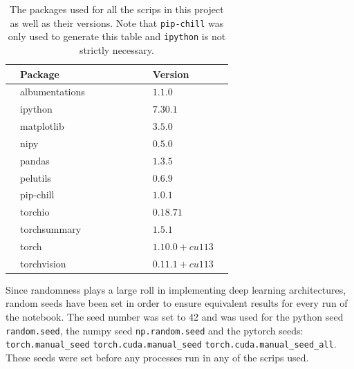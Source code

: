 \documentclass[12pt, fleqn, titlepage]{article}
\begin{document}
\begin{table}[H]
	\begin{center}
		\begin{tabular}{l l l l l l l l l l}
			\toprule			
			
			& \textbf{Package \cite{python_packages}}      & & & & & & & \textbf{Version}  & \\ \midrule
			& albumentations \cite{albumentations}         & & & & & & & $1.1.0$           & \\ 
			& ipython \cite{ipython}                       & & & & & & & $7.30.1$          & \\ 
			& matplotlib \cite{matplotlib}                 & & & & & & & $3.5.0$           & \\ 
			& nipy \cite{nipy}                             & & & & & & & $0.5.0$           & \\
			& pandas \cite{pandas}                         & & & & & & & $1.3.5$           & \\
			& pelutils \cite{pelutils}                     & & & & & & & $0.6.9$           & \\
			& pip-chill \cite{pip-chill}                   & & & & & & & $1.0.1$           & \\
			& torchio \cite{torchio}                       & & & & & & & $0.18.71$         & \\
			& torchsummary \cite{torchsummary}             & & & & & & & $1.5.1$           & \\
			& torch \cite{pytorch}                         & & & & & & & $1.10.0+cu113$    & \\
			& torchvision \cite{torchvision}               & & & & & & & $0.11.1+cu113$    & \\
			\bottomrule
		\end{tabular}
		\caption{The packages used for all the scrips in this project as well as their versions. Note that \texttt{pip-chill} was only used to generate this table and \texttt{ipython} is not strictly necessary.}
		\label{tab:packages}
	\end{center}
\end{table}
\noindent Since randomness plays a large roll in implementing deep learning architectures, random seeds have been set in order to ensure equivalent results for every run of the notebook. The seed number was set to 42 and was used for the python seed \texttt{random.seed}, the numpy seed \texttt{np.random.seed} and the pytorch seeds: \newline \texttt{torch.manual\_seed} \texttt{torch.cuda.manual\_seed}
\texttt{torch.cuda.manual\_seed\_all}. These seeds were set before any processes run in any of the scrips used.
\end{document}

